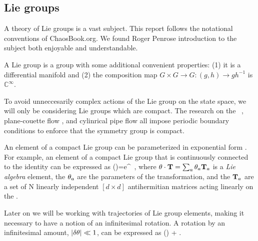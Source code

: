 {\subsection{Lie groups}

A theory of Lie groups is a vast subject. This report follows the notational conventions of ChaosBook.org. We found Roger Penrose introduction to the subject both enjoyable and understandable.

A Lie group is a group with some additional convenient properties:
(1) it is a differential manifold
and (2) the composition map $G \times G \rightarrow G : (g,h)
\rightarrow g h^{-1}$ is $\mathbb{C}^\infty$.

To avoid unneccesarily complex actions of the Lie group on the state space, we will only be considering Lie groups which are compact. The research on the \KS\ , plane-couette flow , and cylinrical pipe flow  all impose periodic boundary conditions to enforce that the symmetry group is compact.

An element of a compact Lie group can be parameterized in exponential form .
For example,
an element of a compact Lie group that is continuously
connected to the identity can be expressed as
\beq
\LieEl(\gSpace)=e^{{\gSpace} \cdot \Lg }
\,,
where ${\bf \theta} \cdot \mathbf{T} = \sum_a {\bf \theta}_a \mathbf{T}_a$ is a \emph{Lie algebra} element, the ${\bf \theta}_a$ are the parameters of the transformation, and the $\mathbf{T}_a$ are a set of N linearly independent
$[d\times d]$ antihermitian matrices acting linearly on the
{\statesp}.
%

Later on we will be working with trajectories of Lie group elements, making it necessary to have a notion of an infinitesimal rotation. A rotation by an infinitesimal amount, $|\delta {\bf \theta}| \ll
1$, can be expressed as
\beq
\LieEl(\delta \gSpace)  + \delta \gSpace \cdot \Lg.

}
